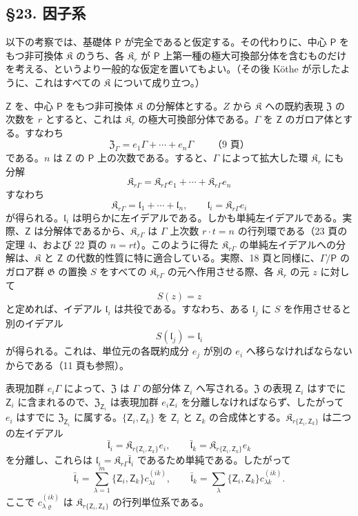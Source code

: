 \subsection*{\S 23. 因子系}\label{faktorensysteme}

以下の考察では、基礎体 \(\mathsf P\) が完全であると仮定する。その代わりに、中心 \(\mathsf P\) をもつ非可換体 \(\mathfrak K\) のうち、各 \(\mathfrak K_r\) が \(\mathsf P\) 上第一種の極大可換部分体を含むものだけを考える、というより一般的な仮定を置いてもよい。（その後 Köthe が示したように、これはすべての \(\mathfrak K\) について成り立つ。）

\(\mathsf{Z}\) を、中心 \(\mathsf P\) をもつ非可換体 \(\mathfrak K\) の分解体とする。\(Z\) から \(\mathfrak K\) への既約表現 \(\mathfrak Z\) の次数を \(r\) とすると、これは \(\mathfrak K_r\) の極大可換部分体である。\(\Gamma\) を \(\mathsf{Z}\) のガロア体とする。すなわち
\[
\mathfrak Z_\Gamma=e_1\Gamma+\cdots+e_n\Gamma
\qquad\text{（9 頁）}
\]
である。\(n\) は \(\mathsf{Z}\) の \(\mathsf P\) 上の次数である。すると、\(\Gamma\) によって拡大した環 \(\mathfrak K_r\) にも分解
\[
\mathfrak K_{r\Gamma}=\mathfrak K_{r\Gamma}e_1+\cdots+\mathfrak K_{r\Gamma}e_n
\]
すなわち
\[
\mathfrak K_{r\Gamma}=\mathfrak l_1+\cdots+\mathfrak l_n,\qquad
\mathfrak l_i=\mathfrak K_{r\Gamma}e_i
\]
が得られる。\(\mathfrak l_i\) は明らかに左イデアルである。しかも単純左イデアルである。実際、\(\mathsf{Z}\) は分解体であるから、\(\mathfrak K_{r\Gamma}\) は \(\Gamma\) 上次数 \(r\cdot t=n\) の行列環である（23 頁の定理 4、および 22 頁の \(n=rt\)）。このように得た \(\mathfrak K_{r\Gamma}\) の単純左イデアルへの分解は、\(\mathfrak K\) と \(\mathsf{Z}\) の代数的性質に特に適合している。実際、18 頁と同様に、\(\Gamma/\mathsf P\) のガロア群 \(\mathfrak G\) の置換 \(S\) をすべての \(\mathfrak K_{r\Gamma}\) の元へ作用させる際、各 \(\mathfrak K_r\) の元 \(z\) に対して
\[
S(z)=z
\]
と定めれば、イデアル \(\mathfrak l_i\) は共役である。すなわち、ある \(\mathfrak l_j\) に \(S\) を作用させると別のイデアル
\[
S(\mathfrak l_j)=\mathfrak l_i
\]
が得られる。これは、単位元の各既約成分 \(e_j\) が別の \(e_i\) へ移らなければならないからである（11 頁も参照）。

表現加群 \(e_i\Gamma\) によって、\(\mathfrak Z\) は \(\Gamma\) の部分体 \(\mathsf{Z}_i\) へ写される。\(\mathfrak Z\) の表現 \(\mathsf{Z}_i\) はすでに \(\mathsf{Z}_i\) に含まれるので、\(\mathfrak Z_{\mathsf{Z}_i}\) は表現加群 \(e_i\mathsf{Z}_i\) を分離しなければならず、したがって \(e_i\) はすでに \(\mathfrak Z_{\mathsf{Z}_i}\) に属する。\(\{\mathsf{Z}_i,\mathsf{Z}_k\}\) を \(\mathsf{Z}_i\) と \(\mathsf{Z}_k\) の合成体とする。\(\mathfrak K_{r\{\mathsf{Z}_i,\mathsf{Z}_k\}}\) は二つの左イデアル
\[
\bar{\mathfrak l}_i=\mathfrak K_{r\{\mathsf{Z}_i,\mathsf{Z}_k\}}e_i,\qquad
\bar{\mathfrak l}_k=\mathfrak K_{r\{\mathsf{Z}_i,\mathsf{Z}_k\}}e_k
\]
を分離し、これらは \(\mathfrak l_i=\mathfrak K_{r\Gamma}\bar{\mathfrak l}_i\) であるため単純である。したがって
\[
\bar{\mathfrak l}_i=\sum_{\lambda=1}^m\{\mathsf{Z}_i,\mathsf{Z}_k\}c_{\lambda i}^{(ik)},\qquad
\bar{\mathfrak l}_k=\sum_{\lambda}\{\mathsf{Z}_i,\mathsf{Z}_k\}c_{\lambda k}^{(ik)}.
\]
ここで \(c_{\lambda\varrho}^{(ik)}\) は \(\mathfrak K_{r\{\mathsf{Z}_i,\mathsf{Z}_k\}}\) の行列単位系である。


